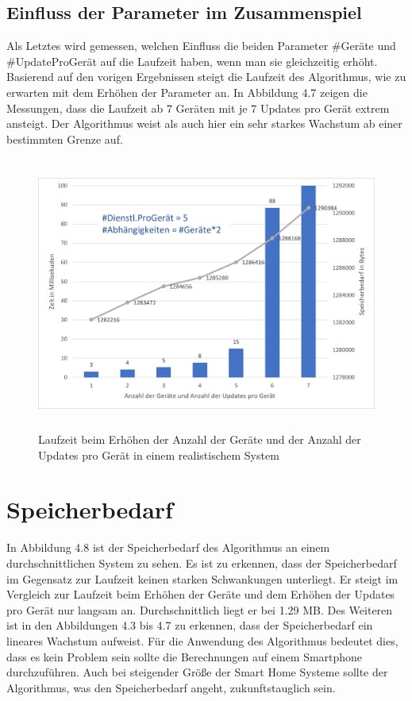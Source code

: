 \subsection{Einfluss der Parameter im Zusammenspiel}
Als Letztes wird gemessen, welchen Einfluss die beiden Parameter \#Geräte und \#UpdateProGerät auf die Laufzeit haben, wenn man sie gleichzeitig erhöht.
Basierend auf den vorigen Ergebnissen steigt die Laufzeit des Algorithmus, wie zu erwarten mit dem Erhöhen der Parameter an. 
In Abbildung 4.7 zeigen die Messungen, dass die Laufzeit ab 7 Geräten mit je 7 Updates pro Gerät extrem ansteigt. Der Algorithmus weist als auch hier
ein sehr starkes Wachstum ab einer bestimmten Grenze auf.
\begin{figure}[h]
\begin{center}
\includegraphics[width=14cm,height=9cm]{"images/Beides"}
\caption{Laufzeit beim Erhöhen der Anzahl der Geräte und der Anzahl der Updates pro Gerät in einem realistischem System}
\label{fig:Prob1:MEA}
\end{center}
\end{figure}

\newpage
\section{Speicherbedarf}
In Abbildung 4.8 ist der Speicherbedarf des Algorithmus an einem durchschnittlichen System zu sehen. Es ist zu erkennen,
dass der Speicherbedarf im Gegensatz zur Laufzeit keinen starken Schwankungen unterliegt. Er steigt im Vergleich zur
Laufzeit beim Erhöhen der Geräte und dem Erhöhen der Updates pro Gerät nur langsam an. Durchschnittlich liegt er
bei 1.29 MB. Des Weiteren ist in den Abbildungen 4.3 bis 4.7 zu erkennen, dass der Speicherbedarf ein lineares Wachstum
aufweist. Für die Anwendung des Algorithmus bedeutet dies, dass es kein Problem sein sollte die Berechnungen auf einem Smartphone
durchzuführen. Auch bei steigender Größe der Smart Home Systeme sollte der Algorithmus, was den Speicherbedarf angeht, zukunftstauglich
sein.

